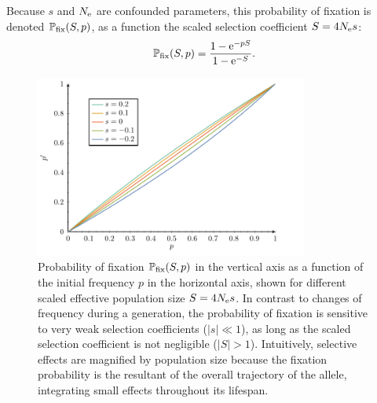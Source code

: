 Because $s$ and $N_{\textrm{e}}$ are confounded parameters, this probability of fixation is denoted $\mathbb{P}_{\mathrm{fix}}(S, p)$, as a function the scaled selection coefficient $S = 4 N_{\textrm{e}} s$:
\begin{equation}
\mathbb{P}_{\mathrm{fix}}(S, p) = \dfrac{1 - \mathrm{e}^{- p S }}{1 - \mathrm{e}^{-S}}.
\end{equation}


\begin{figure}[H]
    \centering
    \includegraphics[width=0.8\textwidth, page=3] {figures.pdf}
    \caption[Probability of fixation]{
    Probability of fixation $\mathbb{P}_{\mathrm{fix}}(S, p)$ in the vertical axis as a function of the initial frequency $p$ in the horizontal axis, shown for different scaled effective population size $S=4 N_{\textrm{e}} s$.
    In contrast to changes of frequency during a generation, the probability of fixation is sensitive to very weak selection coefficients ($|s| \ll 1$), as long as the scaled selection coefficient is not negligible ($|S| > 1$).
    Intuitively, selective effects are magnified by population size because the fixation probability is the resultant of the overall trajectory of the allele, integrating small effects throughout its lifespan. }
\label{fig:pfix-p}
\end{figure}

